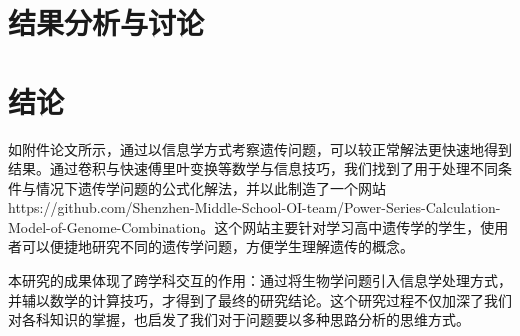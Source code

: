 \documentclass[12pt]{article} %
\begin{document}
\section{结果分析与讨论}


\section{结论}

如附件论文所示，通过以信息学方式考察遗传问题，可以较正常解法更快速地得到结果。通过卷积与快速傅里叶变换等数学与信息技巧，我们找到了用于处理不同条件与情况下遗传学问题的公式化解法，并以此制造了一个网站 https://github.com/Shenzhen-Middle-School-OI-team/Power-Series-Calculation-Model-of-Genome-Combination。这个网站主要针对学习高中遗传学的学生，使用者可以便捷地研究不同的遗传学问题，方便学生理解遗传的概念。

本研究的成果体现了跨学科交互的作用：通过将生物学问题引入信息学处理方式，并辅以数学的计算技巧，才得到了最终的研究结论。这个研究过程不仅加深了我们对各科知识的掌握，也启发了我们对于问题要以多种思路分析的思维方式。


\end{document}
